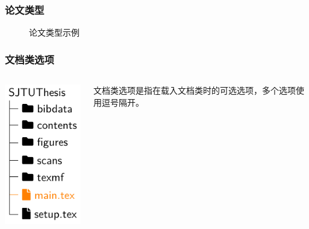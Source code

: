 \begin{frame}[fragile, label=covers]
  \frametitle{论文类型}
  \begin{figure}
    \hspace{-7pt}\parbox{0.8\textwidth}{
      \begin{subfigure}{0.20\textwidth}
        \caption{}
      \end{subfigure}\hfill
      \begin{subfigure}{0.20\textwidth}
        \caption{}
      \end{subfigure}\hfill
      \begin{subfigure}{0.20\textwidth}
        \caption{}
      \end{subfigure}
      \caption{论文类型示例}
    }
  \end{figure}
\end{frame}

\begin{frame}[fragile]
  \frametitle{文档类选项}
  \begin{columns}
    \begin{column}{0.35\textwidth}
      \includegraphics[page=2]{support/figures/thesisdir.pdf}
    \end{column}
    \begin{column}{0.65\textwidth}
      文档类选项是指在载入文档类时的可选选项，多个选项使用逗号隔开。
      
    \end{column}
  \end{columns}
\end{frame}

